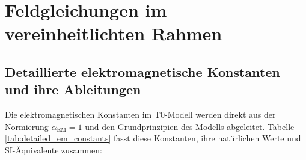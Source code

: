 \documentclass[twocolumn,aps,prl]{revtex4-2}
\begin{document}
{{{{{{{{{											\section{Feldgleichungen im vereinheitlichten Rahmen}
											\label{sec:field_equations}
											
											\subsection{Detaillierte elektromagnetische Konstanten und ihre Ableitungen}
											\label{subsec:detailed_em_constants}
											
											Die elektromagnetischen Konstanten im T0-Modell werden direkt aus der Normierung \(\alpha_{\text{EM}} = 1\) und den Grundprinzipien des Modells abgeleitet. Tabelle \ref{tab:detailed_em_constants} fasst diese Konstanten, ihre natürlichen Werte und SI-Äquivalente zusammen:
											
}}}}}}}}}
\end{document}
